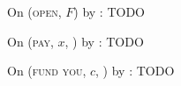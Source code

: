 \begin{figure}[H]
  \begin{simulatorbox}{\simulator}
    \begin{algorithmic}[1]
      \State On (\textsc{open}, $F$) by \fchan:
      \Indent
        \State TODO
      \EndIndent
      \Statex

      \State On (\textsc{pay}, $x$, \dave) by \fchan:
      \Indent
        \State TODO
      \EndIndent
      \Statex

      \State On (\textsc{fund you}, $c$, \dave) by \fchan:
      \Indent
        \State TODO
      \EndIndent
    \end{algorithmic}
  \end{simulatorbox}
  \caption{}
  \label{code:simulator}
\end{figure}
